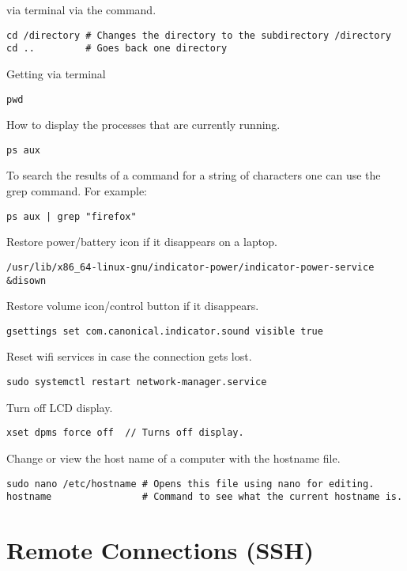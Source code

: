  via terminal via the command.
\begin{lstlisting}
cd /directory # Changes the directory to the subdirectory /directory
cd ..         # Goes back one directory
\end{lstlisting}

Getting  via terminal
\begin{lstlisting}
pwd
\end{lstlisting}

How to display the processes that are currently running.
\begin{lstlisting}
ps aux
\end{lstlisting}

To search the results of a command for a string of characters one can use the grep command. For example:
\begin{lstlisting}
ps aux | grep "firefox"
\end{lstlisting}

Restore power/battery icon if it disappears on a laptop.
\begin{lstlisting}
/usr/lib/x86_64-linux-gnu/indicator-power/indicator-power-service &disown 
\end{lstlisting}

Restore volume icon/control button if it disappears.
\begin{lstlisting}
gsettings set com.canonical.indicator.sound visible true
\end{lstlisting}

Reset wifi services in case the connection gets lost.
\begin{lstlisting}
sudo systemctl restart network-manager.service
\end{lstlisting}

Turn off LCD display.
\begin{lstlisting}
xset dpms force off  // Turns off display.
\end{lstlisting}

Change or view the host name of a computer with the hostname file.
\begin{lstlisting}
sudo nano /etc/hostname # Opens this file using nano for editing.
hostname                # Command to see what the current hostname is.
\end{lstlisting}







\section{Remote Connections (SSH)}


